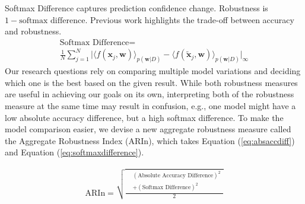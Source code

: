 Softmax Difference \cite{carbone2020a} captures prediction confidence change. Robustness is $1 - \text{softmax difference}$. Previous work \cite{isrobustnessdongsu2018} highlights the trade-off between accuracy and robustness.
    \begin{multline} \label{eq:softmaxdifference}
    \text{Softmax Difference}=\\ \frac{1}{N} \sum_{j=1}^{N} 
    \Big|
    \big\langle f(\mathbf{x}_j, \mathbf{w}) \big\rangle_{p(\mathbf{w}|D)}
    -
    \big\langle f(\tilde{\mathbf{x}}_j, \mathbf{w}) \big\rangle_{p(\mathbf{w}|D)}
    \Big|_{\infty}
    \end{multline}
Our research questions rely on comparing multiple model variations and deciding which one is the best based on the given result. While both robustness measures are useful in achieving our goals on its own, interpreting both of the robustness measure at the same time may result in confusion, e.g., one model might have a low absolute accuracy difference, but a high softmax difference. To make the model comparison easier, we devise a new aggregate robustness measure called the Aggregate Robustness Index (ARIn), which takes Equation (\ref{eq:absaccdiff}) and Equation (\ref{eq:softmaxdifference}).



\begin{multline}
\text{ARIn} = \sqrt{\frac{\begin{aligned} &\left(\text{Absolute Accuracy Difference}\right)^2 \\ &+ \left(\text{Softmax Difference}\right)^2 \end{aligned}}{2}}
\label{eq:ARIn}
\end{multline}




